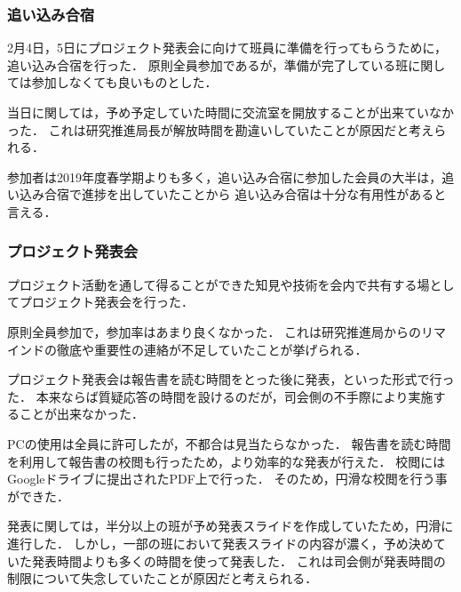 \subsubsection*{追い込み合宿}
2月4日，5日にプロジェクト発表会に向けて班員に準備を行ってもらうために，追い込み合宿を行った．
原則全員参加であるが，準備が完了している班に関しては参加しなくても良いものとした．

当日に関しては，予め予定していた時間に交流室を開放することが出来ていなかった．
これは研究推進局長が解放時間を勘違いしていたことが原因だと考えられる．

参加者は2019年度春学期よりも多く，追い込み合宿に参加した会員の大半は，追い込み合宿で進捗を出していたことから
追い込み合宿は十分な有用性があると言える．

\subsubsection*{プロジェクト発表会}
プロジェクト活動を通して得ることができた知見や技術を会内で共有する場としてプロジェクト発表会を行った．

原則全員参加で，参加率はあまり良くなかった．
これは研究推進局からのリマインドの徹底や重要性の連絡が不足していたことが挙げられる．

プロジェクト発表会は報告書を読む時間をとった後に発表，といった形式で行った．
本来ならば質疑応答の時間を設けるのだが，司会側の不手際により実施することが出来なかった．

PCの使用は全員に許可したが，不都合は見当たらなかった．
報告書を読む時間を利用して報告書の校閲も行ったため，より効率的な発表が行えた．
校閲にはGoogleドライブに提出されたPDF上で行った．
そのため，円滑な校閲を行う事ができた．

発表に関しては，半分以上の班が予め発表スライドを作成していたため，円滑に進行した．
しかし，一部の班において発表スライドの内容が濃く，予め決めていた発表時間よりも多くの時間を使って発表した．
これは司会側が発表時間の制限について失念していたことが原因だと考えられる．


